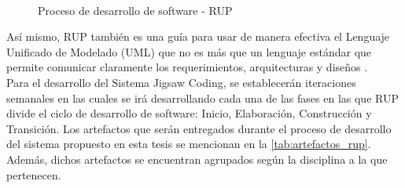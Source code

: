 \begin{figure}[!h]
  \centering
  \\
  \caption[RUP]{Proceso de desarrollo de software - RUP \protect\cite{rup_small}}\label{fig:rup}
\end{figure}

Así mismo, RUP también es una guía para usar de manera efectiva el Lenguaje Unificado de Modelado (UML) que no es más que un lenguaje estándar que permite comunicar claramente los requerimientos, arquitecturas y diseños \cite{rup_ibm_2014}.\\

Para el desarrollo del Sistema Jigsaw Coding, se establecerán iteraciones semanales en las cuales se irá desarrollando cada una de las fases en las que RUP divide el ciclo de desarrollo de software: Inicio, Elaboración, Construcción y Transición. Los artefactos que serán entregados durante el proceso de desarrollo del sistema propuesto en esta tesis se mencionan en la  \autoref{tab:artefactos_rup}. Además, dichos artefactos se encuentran agrupados según la disciplina a la que pertenecen.

